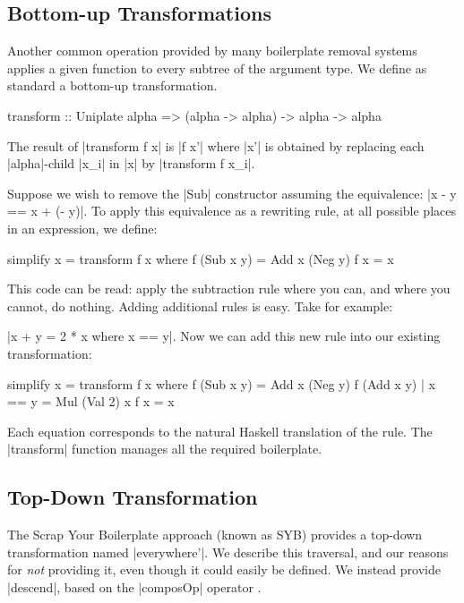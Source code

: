 \subsection{Bottom-up Transformations}

Another common operation provided by many boilerplate removal systems \citep{lammel:syb,stratego,strafunski,ren:generic_recursion_toolbox} applies a given function to every subtree of the argument type. We define as standard a bottom-up transformation.

\begin{code}
transform :: Uniplate alpha => (alpha -> alpha) -> alpha -> alpha
\end{code}

The result of |transform f x| is |f x'| where |x'| is obtained by replacing each |alpha|-child |x_i| in |x| by |transform f x_i|.

\begin{example}
\label{exU:simplify}
Suppose we wish to remove the |Sub| constructor assuming the equivalence: |x - y == x + (- y)|. To apply this equivalence as a rewriting rule, at all possible places in an expression, we define:

\begin{code}
simplify x = transform f x
    where  f (Sub x y)  = Add x (Neg y)
           f x          = x
\end{code}

This code can be read: apply the subtraction rule where you can, and where you cannot, do nothing. Adding additional rules is easy. Take for example: \ignore|x + y = 2 * x where x == y|. Now we can add this new rule into our existing transformation:

\begin{code}
simplify x = transform f x
    where  f (Sub x y)           = Add x (Neg y)
           f (Add x y) | x == y  = Mul (Val 2) x
           f x                   = x
\end{code}

Each equation corresponds to the natural Haskell translation of the rule. The |transform| function manages all the required boilerplate.
\end{example}

\subsection{Top-Down Transformation}

The Scrap Your Boilerplate approach \cite{lammel:syb} (known as SYB) provides a top-down transformation named |everywhere'|. We describe this traversal, and our reasons for \textit{not} providing it, even though it could easily be defined. We instead provide |descend|, based on the |composOp| operator \cite{bringert:compos}.

